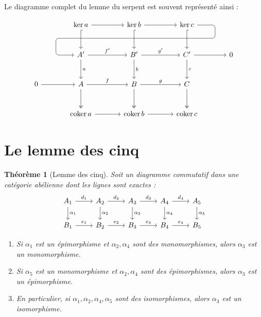 \documentclass[a4paper,12pt]{book}
\DeclareMathOperator{\coker}{coker}
\newtheorem{theoreme}{Théorème}[chapter]
\begin{document}
Le diagramme complet du lemme du serpent est souvent représenté ainsi :

\[
\begin{tikzcd}[column sep=large, row sep=large]
  & \ker a \arrow[r] \arrow[d, hook]
  & \ker b \arrow[r] \arrow[d, hook]
  & \ker c \arrow[d, hook]
    \arrow[dll, "\delta"',
      rounded corners,
      to path={ -- ([xshift=2.5em]\tikztostart.east)
                |- ([yshift=-1.2em]\tikztostart.south) -| ([xshift=-2.5em]\tikztotarget.west)
                -- (\tikztotarget)}] \\
  & A' \arrow[r, "f'"] \arrow[d, "a"]
  & B' \arrow[r, "g'"] \arrow[d, "b"]
  & C' \arrow[r] \arrow[d, "c"]
  & 0 \\
0 \arrow[r]
  & A \arrow[r, "f"] \arrow[d, two heads]
  & B \arrow[r, "g"] \arrow[d, two heads]
  & C \arrow[d, two heads] \\
  & \coker a \arrow[r]
  & \coker b \arrow[r]
  & \coker c
\end{tikzcd}
\]


\section{Le lemme des cinq}\label{sec:five-lemma}

\begin{theoreme}[Lemme des cinq]\label{thm:five-lemma}
Soit un diagramme commutatif dans une catégorie abélienne dont les lignes
sont exactes :
\[
\begin{tikzcd}
A_1 \arrow[r, "d_1"] \arrow[d, "\alpha_1"]
& A_2 \arrow[r, "d_2"] \arrow[d, "\alpha_2"]
& A_3 \arrow[r, "d_3"] \arrow[d, "\alpha_3"]
& A_4 \arrow[r, "d_4"] \arrow[d, "\alpha_4"]
& A_5 \arrow[d, "\alpha_5"] \\
B_1 \arrow[r, "e_1"]
& B_2 \arrow[r, "e_2"]
& B_3 \arrow[r, "e_3"]
& B_4 \arrow[r, "e_4"]
& B_5
\end{tikzcd}
\]
\begin{enumerate}[label=(\roman*)]
\item Si $\alpha_1$ est un épimorphisme et $\alpha_2, \alpha_4$ sont des
  monomorphismes, alors $\alpha_3$ est un monomorphisme.
\item Si $\alpha_5$ est un monomorphisme et $\alpha_2, \alpha_4$ sont des
  épimorphismes, alors $\alpha_3$ est un épimorphisme.
\item En particulier, si $\alpha_1, \alpha_2, \alpha_4, \alpha_5$ sont des
  isomorphismes, alors $\alpha_3$ est un isomorphisme.
\end{enumerate}
\end{theoreme}
\end{document}
